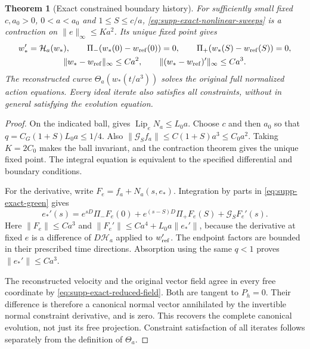 \documentclass[11pt]{article}
\newtheorem{theorem}{Theorem}[section]
\numberwithin{equation}{section}
\theoremstyle{definition}
\theoremstyle{remark}
\begin{document}
\begin{theorem}[Exact constrained boundary history]
\label{thm:supp-exact-boundary}
For sufficiently small fixed $c,a_0>0$, $0<a<a_0$ and $1\le S\le c/a$,
\eqref{eq:supp-exact-nonlinear-sweeps} is a contraction on
$\|e\|_\infty\le K a^2$. Its unique fixed point gives
\begin{equation}
 \begin{gathered}
 w_*'=\mathcal H_a(w_*),\qquad
 \Pi_-(w_*(0)-w_{\rm ref}(0))=0,\qquad
 \Pi_+(w_*(S)-w_{\rm ref}(S))=0,\\
 \|w_*-w_{\rm ref}\|_\infty\le Ca^2,\qquad
 \|(w_*-w_{\rm ref})'\|_\infty\le Ca^3.
 \end{gathered}
 \label{eq:supp-exact-boundary-estimate}
\end{equation}
The reconstructed curve $\Theta_a(w_*(t/a^3))$ solves the original full
normalized action equations. Every ideal iterate also satisfies all
constraints, without in general satisfying the evolution equation.
\end{theorem}
\begin{proof}
On the indicated ball,  gives
$\operatorname{Lip}_eN_a\le L_0a$. Choose $c$ and then $a_0$ so that
$q=C_G(1+S)L_0a\le1/4$. Also
$\|\mathcal G_S f_a\|\le C(1+S)a^3\le C_0a^2$.
Taking $K=2C_0$ makes the ball invariant, and the contraction theorem gives
the unique fixed point. The integral equation is equivalent to the
specified differential and boundary conditions.

For the derivative, write $F_e=f_a+N_a(s,e_*)$. Integration by parts in
\eqref{eq:supp-exact-green} gives
\[
 e_*'(s)=e^{sD}\Pi_-F_e(0)+e^{(s-S)D}\Pi_+F_e(S)
                    +\mathcal G_S F_e'(s).
\]
Here $\|F_e\|\le Ca^3$ and
$\|F_e'\|\le Ca^4+L_0a\|e_*'\|$, because the derivative at fixed $e$
is a difference of $D\mathcal H_a$ applied to $w_{\rm ref}'$.
The endpoint factors are bounded in their prescribed time directions.
Absorption using the same $q<1$ proves $\|e_*'\|\le Ca^3$.

The reconstructed velocity and the original vector field agree in every
free coordinate by \eqref{eq:supp-exact-reduced-field}. Both are tangent to
$P_h=0$. Their difference is therefore a canonical normal vector annihilated
by the invertible normal constraint derivative, and is zero. This recovers
the complete canonical evolution, not just its free projection. Constraint
satisfaction of all iterates follows separately from the definition of
$\Theta_a$.
\end{proof}
\end{document}
